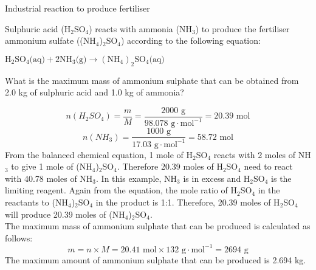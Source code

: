 \begin{wex}{Industrial reaction to produce fertiliser}{Sulphuric acid (H$_{2}$SO$_{4}$) reacts with ammonia (NH$_{3}$) to produce the fertiliser ammonium sulfate ((NH$_{4}$)$_{2}$SO$_{4}$) according to the following equation:
\begin{center}
$\text{H}_{2}\text{SO}_{4}\text{(aq)} + 2\text{NH}_{3}\text{(g)} \rightarrow (\text{NH}_{4})_{2}\text{SO}_{4}\text{(aq)}$
\end{center}
What is the maximum mass of ammonium sulphate that can be obtained from 2.0 kg of sulphuric acid and 1.0 kg of ammonia?
}{
\begin{equation*}
n(H_{2}SO_{4}) = \frac{m}{M} = \frac{2000 \text{ g}}{98.078 \text{ g} \cdot \text{mol}^{-1}} = 20.39 \text{ mol}
\end{equation*}
\begin{equation*}
n(NH_{3}) = \frac{1000 \text{ g}}{17.03 \text{ g} \cdot \text{mol}^{-1}} = 58.72 \text{ mol}
\end{equation*}
From the balanced chemical equation, 1 mole of H$_{2}$SO$_{4}$ reacts with 2 moles of NH$_{3}$ to give 1 mole of (NH$_{4}$)$_{2}$SO$_{4}$. Therefore 20.39 moles of H$_{2}$SO$_{4}$ need to react with 40.78 moles of NH$_{3}$. In this example, NH$_{3}$ is in excess and H$_{2}$SO$_{4}$ is the limiting reagent.
Again from the equation, the mole ratio of H$_{2}$SO$_{4}$ in the reactants to (NH$_{4}$)$_{2}$SO$_{4}$ in the product is 1:1. Therefore, 20.39 moles of H$_{2}$SO$_{4}$ will produce 20.39 moles of (NH$_{4}$)$_{2}$SO$_{4}$.\\

The maximum mass of ammonium sulphate that can be produced is calculated as follows:
\begin{equation*}
m = n \times M = 20.41 \text{ mol} \times 132 \text{ g} \cdot \text{mol}^{-1} = 2694 \text{ g}
\end{equation*}
The maximum amount of ammonium sulphate that can be produced is 2.694 kg.
}
\end{wex}
\pagebreak
{}


